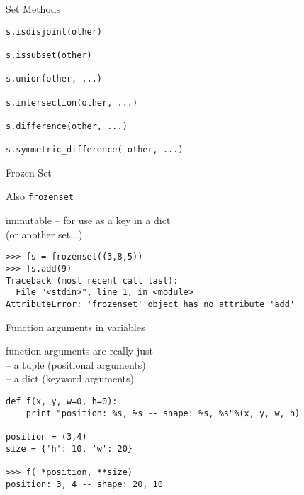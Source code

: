 \documentclass{beamer}
\begin{document}
\begin{frame}[fragile]{ Set Methods}

\begin{verbatim}
s.isdisjoint(other)

s.issubset(other)

s.union(other, ...)

s.intersection(other, ...)

s.difference(other, ...)

s.symmetric_difference( other, ...)
\end{verbatim}

\vfill
\end{frame} 

\begin{frame}[fragile]{ Frozen Set}

\vfill
{\Large Also \verb|frozenset|}

\vfill
{\Large immutable -- for use as a key in a dict\\
(or another set...)}

\vfill
\begin{verbatim}
>>> fs = frozenset((3,8,5))
>>> fs.add(9)
Traceback (most recent call last):
  File "<stdin>", line 1, in <module>
AttributeError: 'frozenset' object has no attribute 'add'
\end{verbatim}

\vfill
\end{frame} 

\begin{frame}[fragile]{Function arguments in variables}

{\Large function arguments are really just\\
 -- a tuple (positional arguments) \\
 -- a dict (keyword arguments) \\
}
\begin{verbatim}
def f(x, y, w=0, h=0):
    print "position: %s, %s -- shape: %s, %s"%(x, y, w, h)

position = (3,4)
size = {'h': 10, 'w': 20}

>>> f( *position, **size)
position: 3, 4 -- shape: 20, 10
\end{verbatim}

\end{frame} 
\end{document}
